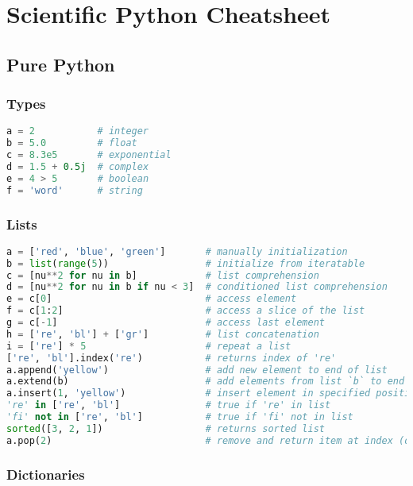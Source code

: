 \documentclass[]{article}
\date{}
\begin{document}
\section{Scientific Python
Cheatsheet}\label{scientific-python-cheatsheet}

\subsection{Pure Python}\label{pure-python}

\subsubsection{Types}\label{types}

\begin{lstlisting}[language=Python]
a = 2           # integer
b = 5.0         # float
c = 8.3e5       # exponential
d = 1.5 + 0.5j  # complex
e = 4 > 5       # boolean
f = 'word'      # string
\end{lstlisting}

\subsubsection{Lists}\label{lists}

\begin{lstlisting}[language=Python]
a = ['red', 'blue', 'green']       # manually initialization
b = list(range(5))                 # initialize from iteratable
c = [nu**2 for nu in b]            # list comprehension
d = [nu**2 for nu in b if nu < 3]  # conditioned list comprehension
e = c[0]                           # access element
f = c[1:2]                         # access a slice of the list
g = c[-1]                          # access last element
h = ['re', 'bl'] + ['gr']          # list concatenation
i = ['re'] * 5                     # repeat a list
['re', 'bl'].index('re')           # returns index of 're'
a.append('yellow')                 # add new element to end of list
a.extend(b)                        # add elements from list `b` to end of list `a`
a.insert(1, 'yellow')              # insert element in specified position
're' in ['re', 'bl']               # true if 're' in list
'fi' not in ['re', 'bl']           # true if 'fi' not in list
sorted([3, 2, 1])                  # returns sorted list
a.pop(2)                           # remove and return item at index (default last)
\end{lstlisting}

\subsubsection{Dictionaries}\label{dictionaries}
\end{document}
